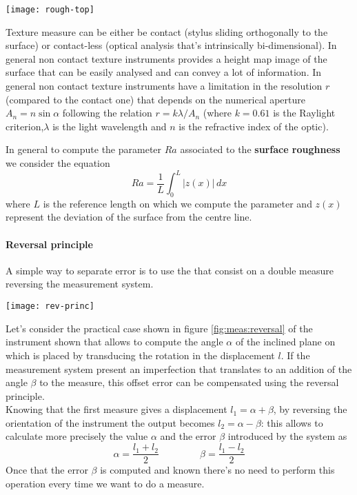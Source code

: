 	\begin{SCfigure}[2][bht]
		\centering \texttt{[image: rough-top]}
		\caption{topology, form and texture surface for a piecea.}
	\end{SCfigure}

	Texture measure can be either be contact (stylus sliding orthogonally to the surface) or contact-less (optical analysis that's intrinsically bi-dimensional). In general non contact texture instruments provides a height map image of the surface that can be easily analysed and can convey a lot of information. In general non contact texture instruments have a limitation in the resolution $r$ (compared to the contact one) that depends on the numerical aperture $A_n = n \sin\alpha$ following the relation $r = k \lambda /A_n$ (where $k=0.61$ is the Raylight criterion,$\lambda$ is the light wavelength and $n$ is the refractive index of the optic).
	
	In general to compute the parameter $Ra$ associated to the \textbf{surface roughness} we consider the equation
	\begin{equation}
		Ra = \frac 1 L \int_0^L |z(x)| \, dx
	\end{equation}
	where $L$ is the reference length on which we compute the parameter and $z(x)$ represent the deviation of the surface from the centre line.
	
	\paragraph{Reversal principle} A simple way to separate error is to use the  that consist on a double measure reversing the measurement system.
	
	\begin{SCfigure}[2][bht]
		\centering \texttt{[image: rev-princ]}
		\caption{application on where the reversal principle can be useful.}
		\label{fig:meas:reversal}
	\end{SCfigure}
	
	Let's consider the practical case shown in figure \ref{fig:meas:reversal} of the instrument shown that allows to compute the angle $\alpha$ of the inclined plane on which is placed by transducing the rotation in the displacement $l$. If the measurement system present an imperfection that translates to an addition of the angle $\beta$ to the measure, this offset error can be compensated using the reversal principle.\\
	Knowing that the first measure gives a displacement $l_1 = \alpha + \beta$, by reversing the orientation of the instrument the output becomes $l_2 = \alpha - \beta$: this allows to calculate more precisely the value $\alpha$ and the error $\beta$ introduced by the system as
	\[ \alpha = \frac{l_1 + l_2}{2} \qquad \ \qquad \beta = \frac{l_1-l_2}{2} \]
	Once that the error $\beta$ is computed and known there's no need to perform this operation every time we want to do a measure.
	
	
	
	